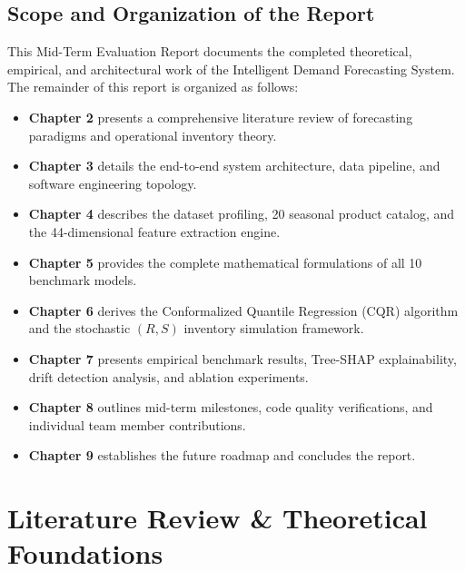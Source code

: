 \documentclass[12pt,a4paper,oneside]{report}
\theoremstyle{definition}
\begin{document}
\section{Scope and Organization of the Report}
This Mid-Term Evaluation Report documents the completed theoretical, empirical, and architectural work of the Intelligent Demand Forecasting System. 
The remainder of this report is organized as follows:
\begin{itemize}[itemsep=0.15cm]
    \item \textbf{Chapter 2} presents a comprehensive literature review of forecasting paradigms and operational inventory theory.
    \item \textbf{Chapter 3} details the end-to-end system architecture, data pipeline, and software engineering topology.
    \item \textbf{Chapter 4} describes the dataset profiling, 20 seasonal product catalog, and the 44-dimensional feature extraction engine.
    \item \textbf{Chapter 5} provides the complete mathematical formulations of all 10 benchmark models.
    \item \textbf{Chapter 6} derives the Conformalized Quantile Regression (CQR) algorithm and the stochastic $(R, S)$ inventory simulation framework.
    \item \textbf{Chapter 7} presents empirical benchmark results, Tree-SHAP explainability, drift detection analysis, and ablation experiments.
    \item \textbf{Chapter 8} outlines mid-term milestones, code quality verifications, and individual team member contributions.
    \item \textbf{Chapter 9} establishes the future roadmap and concludes the report.
\end{itemize}

\newpage
\chapter{Literature Review \& Theoretical Foundations}
\end{document}

